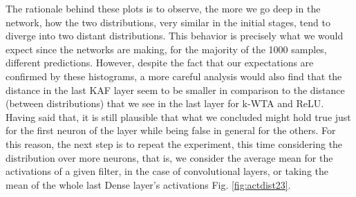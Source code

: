 \documentclass[LaM,binding=0.6cm]{./packages/sapthesis/sapthesis}
\begin{document}
        The rationale behind these plots is to observe, the more we go deep in the network, how the two distributions, very similar in the initial stages, tend to diverge into two distant distributions.
        This behavior is precisely what we would expect since the networks are making, for the majority of the 1000 samples, different predictions. However, despite 
        the fact that our expectations are confirmed by these histograms, a more careful analysis would also find that the distance in the last KAF layer 
        seem to be smaller in comparison to the distance (between distributions) that we see in the last layer for k-WTA and ReLU. Having said that, it is still plausible 
        that what we concluded might hold true just for the first neuron of the layer while being false in general for the others. For this reason, the next step is 
        to repeat the experiment, this time considering the distribution over more neurons, that is, we consider the average mean for the activations of a given 
        filter, in the case of convolutional layers, or taking the mean of the whole last Dense layer's activations Fig. \ref{fig:actdist23}.
\end{document}
